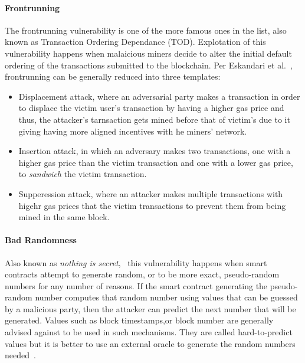             \paragraph{Frontrunning}
            The frontrunning vulnerability is one of the more famous ones in the list, also known as Transaction Ordering Dependance (TOD).
            Explotation of this vulnerability happens when malaicious miners decide to alter the initial default ordering of the transactions submitted to the blockchain.
            Per Eskandari et al.~\cite{eskandari2018frontrunning}, frontrunning can be generally reduced into three templates:
            \begin{itemize}
                \item Displacement attack, where an adversarial party makes a transaction in order to displace the victim user's transaction by having a higher gas price and thus, the attacker's tarnsaction gets mined before that of victim's due to it giving having more aligned incentives with he miners' network.
                \item Insertion attack, in which an adversary makes two transactions, one with a higher gas price than the victim transaction and one with a lower gas price, to \textit{sandwich} the victim transaction.~\cite{varun2022mitigating}
                \item Supperession attack, where an attacker makes multiple transactions with higehr gas prices that the victim transactions to prevent them from being mined in the same block.
            \end{itemize}

            \paragraph{Bad Randomness}
            Also known as \textit{nothing is secret},~\cite{dasp} this vulnerability happens when smart contracts attempt to generate random, or to be more exact, pseudo-random numbers for any number of reasons.
            If the smart contract generating the pseudo-random number computes that random number using values that can be guessed by a malicious party, then the attacker can predict the next number that will be generated.
            Values such as block timestamps,or block number are generally advised against to be used in such mechanisms. They are called hard-to-predict values but it is better to use an external oracle to generate the random numbers needed~\cite{swcregistry}.
        
